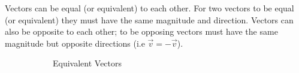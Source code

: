 \documentclass[12pt]{article}
\begin{document}
\begin{flushleft}
\begin{itemize}
{\begin{center}

                    \end{center}
                                        
                } 

            \end{itemize}

            Vectors can be equal (or equivalent) to each other. For two vectors to be equal (or equivalent) 
            they must have the same magnitude and direction. Vectors can also be opposite to each other; to be
            opposing vectors must have the same magnitude but opposite directions 
            (i.e $\vec{v} = -\vec{v}$).

            \begin{figure}[h]
                
                \centering
                \begin{subfigure}[b]{0.4\linewidth}
                    
                    \centering
                    \caption{Equivalent Vectors}

                \end{subfigure}

                \centering
                \begin{subfigure}[b]{0.4\linewidth}
                    

\end{subfigure}
\end{figure}
\end{flushleft}
\end{document}
